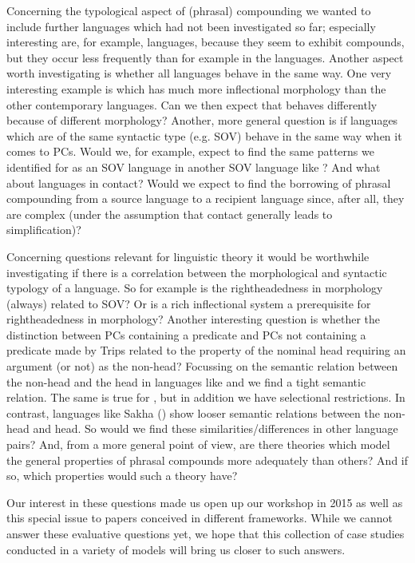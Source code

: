\documentclass[output=paper]{LSP/langsci}
\begin{document}
Concerning the typological aspect of (phrasal) compounding we wanted
to include further languages which had not been investigated so far;
especially interesting are, for example,  languages, because they
seem to exhibit compounds, but they occur less frequently than for
example in the  languages. Another aspect worth investigating
is whether all  languages behave in the same way. One very
interesting example is  which has much more
inflectional morphology than the other contemporary  languages. Can we then
expect that  behaves differently because of different
morphology? Another, more general question is if languages which are
of the same syntactic type (e.g. SOV) behave in the same way when it
comes to PCs. Would we, for example, expect to find the same patterns
we identified for  as an SOV language in another SOV language
like ? And what about languages in contact? Would we expect to
find the borrowing of phrasal compounding from a source language to a
recipient language since, after all, they are complex (under the
assumption that contact generally leads to simplification)?

Concerning questions relevant for linguistic theory it would be
worthwhile investigating if there is a correlation between the
morphological and syntactic typology of a language. So for example is
the rightheadedness in morphology (always) related to SOV? Or is a
rich inflectional system a prerequisite for rightheadedness in
morphology? Another interesting question is whether the distinction
between PCs containing a predicate and PCs not containing a predicate
made by Trips related to the property of the nominal head requiring an
argument (or not) as the non-head?  Focussing on the semantic relation
between the non-head and the head in languages like  and 
we find a tight semantic relation. The same is true for , but
in addition we have selectional restrictions. In contrast, languages
like Sakha () show looser semantic relations between the
non-head and head. So would we find these similarities/differences in
other language pairs? And, from a more general point of view, are
there theories which model the general properties of phrasal compounds more
adequately than others? And if so, which properties would such a theory
have?

Our interest in these questions made us open up our workshop in 2015
as well as this special issue to papers conceived in different
frameworks. While we cannot answer these evaluative questions yet, we
hope that this collection of case studies conducted in a variety of
models will bring us closer to such answers.
\end{document}
